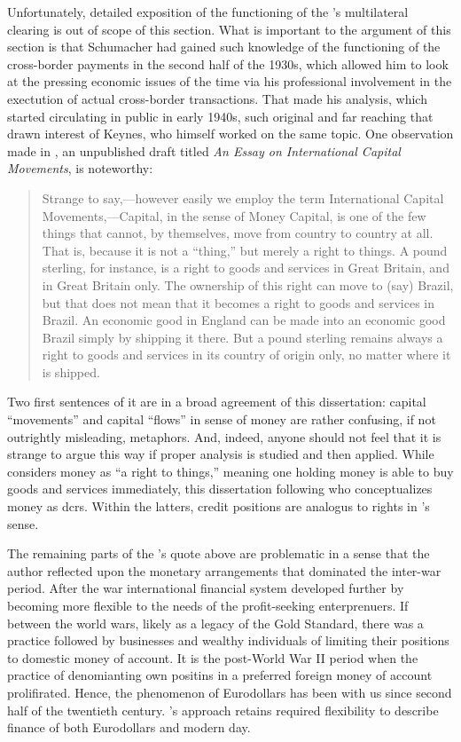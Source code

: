 Unfortunately, detailed exposition of the functioning of the \citeauthor{schumacher1943}'s multilateral clearing is out of scope of this section. What is important to the argument of this section is that Schumacher had gained such knowledge of the functioning of the cross-border payments  in the second half of the 1930s, which allowed him to look at the pressing economic issues of the time via his professional involvement in the exectution of actual cross-border transactions. That made his analysis, which started circulating in public in early 1940s, such original and far reaching that drawn interest of Keynes, who himself worked on the same topic. One observation made in \cite{schumacher1939}, an unpublished draft titled \textit{An Essay on International Capital Movements}, is noteworthy: 
\begin{quote}
Strange to say,---however easily we employ the term International Capital Movements,---Capital, in the sense of Money Capital, is one of the few things that cannot, by themselves, move from country to country at all. That is, because it is not a ``thing,'' but merely a right to things. A pound sterling, for instance, is a right to goods and services in Great Britain, and in Great Britain only. The ownership of this right can move to (say) Brazil, but that does not mean that it becomes a right to goods and services in Brazil. An economic good in England can be made into an economic good Brazil simply by shipping it there. But a pound sterling remains always a right to goods and services in its country of origin only, no matter where it is shipped.~\citep[pp.~3-4]{schumacher1939}
\end{quote}

Two first sentences of it are in a broad agreement of this dissertation: capital ``movements'' and capital ``flows'' in sense of money are rather confusing, if not outrightly misleading, metaphors. And, indeed, anyone should not feel that it is strange to argue this way if proper analysis is studied and then applied. While \citeauthor{schumacher1943} considers money as ``a right to things,'' meaning one holding money is able to buy goods and services immediately, this dissertation following \citeauthor{innes1913} who conceptualizes money as \acfp{dcr}. Within the latters, credit positions are analogus to rights in \citeauthor{schumacher1943}'s sense.  

The remaining parts of the \citeauthor{schumacher1943}'s quote above are problematic in a sense that the author reflected upon the monetary arrangements that dominated the inter-war period. After the war international financial system developed further by becoming more flexible to the needs of the profit-seeking enterprenuers. If between the world wars, likely as a legacy of the Gold Standard, there was a practice followed by businesses and wealthy individuals of limiting their positions to domestic money of account. It is the post-World War II period when the practice of denomianting own positins in a preferred foreign money of account prolifirated. Hence, the phenomenon of Eurodollars has been with us since second half of the twentieth century. \citeauthor{innes1913}'s approach retains required flexibility to describe finance of both Eurodollars and modern day. 

